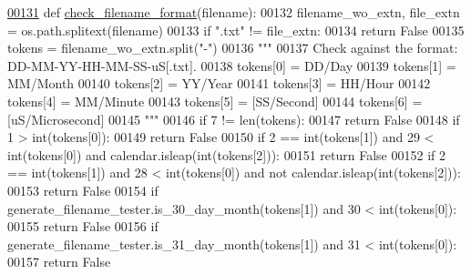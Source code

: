 \begin{DoxyCode}
\hypertarget{classutilities_1_1miscellaneous_1_1misc_l00131}{}\hyperlink{classutilities_1_1miscellaneous_1_1misc_a96b7b4aa054c6c8eb7571314ec8edbc7}{00131}     \textcolor{keyword}{def }\hyperlink{classutilities_1_1miscellaneous_1_1misc_a96b7b4aa054c6c8eb7571314ec8edbc7}{check\_filename\_format}(filename):
00132         filename\_wo\_extn, file\_extn = os.path.splitext(filename)
00133         \textcolor{keywordflow}{if} \textcolor{stringliteral}{".txt"} != file\_extn:
00134             \textcolor{keywordflow}{return} \textcolor{keyword}{False}
00135         tokens = filename\_wo\_extn.split(\textcolor{stringliteral}{"-"})
00136         \textcolor{stringliteral}{"""}
00137 \textcolor{stringliteral}{            Check against the format: DD-MM-YY-HH-MM-SS-uS[.txt].}
00138 \textcolor{stringliteral}{            tokens[0] = DD/Day}
00139 \textcolor{stringliteral}{            tokens[1] = MM/Month}
00140 \textcolor{stringliteral}{            tokens[2] = YY/Year}
00141 \textcolor{stringliteral}{            tokens[3] = HH/Hour}
00142 \textcolor{stringliteral}{            tokens[4] = MM/Minute}
00143 \textcolor{stringliteral}{            tokens[5] = [SS/Second]}
00144 \textcolor{stringliteral}{            tokens[6] = [uS/Microsecond]}
00145 \textcolor{stringliteral}{        """}
00146         \textcolor{keywordflow}{if} 7 != len(tokens):
00147             \textcolor{keywordflow}{return} \textcolor{keyword}{False}
00148         \textcolor{keywordflow}{if} 1 > int(tokens[0]):
00149             \textcolor{keywordflow}{return} \textcolor{keyword}{False}
00150         \textcolor{keywordflow}{if} 2 == int(tokens[1]) \textcolor{keywordflow}{and} 29 < int(tokens[0]) \textcolor{keywordflow}{and} calendar.isleap(int(tokens[2])):
00151             \textcolor{keywordflow}{return} \textcolor{keyword}{False}
00152         \textcolor{keywordflow}{if} 2 == int(tokens[1]) \textcolor{keywordflow}{and} 28 < int(tokens[0]) \textcolor{keywordflow}{and} \textcolor{keywordflow}{not} calendar.isleap(int(tokens[2])):
00153             \textcolor{keywordflow}{return} \textcolor{keyword}{False}
00154         \textcolor{keywordflow}{if} generate\_filename\_tester.is\_30\_day\_month(tokens[1]) \textcolor{keywordflow}{and} 30 < int(tokens[0]):
00155             \textcolor{keywordflow}{return} \textcolor{keyword}{False}
00156         \textcolor{keywordflow}{if} generate\_filename\_tester.is\_31\_day\_month(tokens[1]) \textcolor{keywordflow}{and} 31 < int(tokens[0]):
00157             \textcolor{keywordflow}{return} \textcolor{keyword}{False}

\end{DoxyCode}
